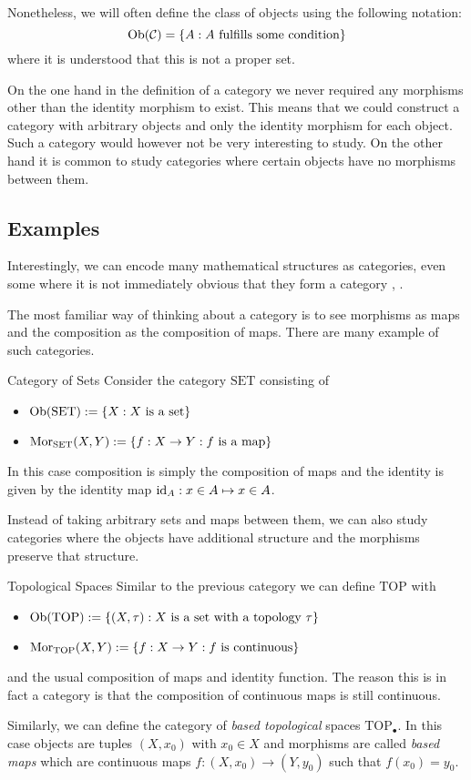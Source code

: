 Nonetheless, we will often define the class of objects using the following notation:
$$
\mathrm {Ob}(\mathcal{C}) = \{A: \text{$A$ fulfills some condition}\}
$$
where it is understood that this is not a proper set.


On the one hand in the definition of a category we never required any morphisms other than the identity morphism to exist.
This means that we could construct a category with arbitrary objects and only the identity morphism for each object. 
Such a category would however not be very interesting to study.
On the other hand it is common to study categories where certain objects have no morphisms between them.

\subsection{Examples}

Interestingly, we can encode many mathematical structures as categories, even some where it is not immediately obvious that they form a category \cite[Chap.~1~Ex.~1-7]{Roman2017}, \cite[Sec.~1.1]{Leinster2014-dc}.

The most familiar way of thinking about a category is to see morphisms as maps and the composition as the composition of maps. There are many example of such categories.

\begin{example}{Category of Sets}{}
Consider the category $\mathrm{SET}$ consisting of
\begin{itemize}
    \item $\mathrm {Ob}(\mathrm{SET}) := \{X: \text{$X$ is a set}\}$
    \item $\mathrm {Mor}_{\mathrm{SET}}(X,Y) := \{f: X \to Y: \text{$f$ is a map}\}$
\end{itemize}
In this case composition is simply the composition of maps and the identity is given by the identity map $\mathrm{id}_A: x \in A \mapsto x \in A$.
\end{example}

Instead of taking arbitrary sets and maps between them, we can also study categories where the objects have additional structure and the morphisms preserve that structure.

\begin{example}{Topological Spaces}{}
Similar to the previous category we can define $\mathrm{TOP}$ with
\begin{itemize}
    \item $\mathrm {Ob}(\mathrm{TOP}) := \{(X,\tau) : \text{$X$ is a set with a topology $\tau$}\}$
    \item $\mathrm {Mor}_{\mathrm{TOP}}(X,Y) := \{f: X \to Y: \text{$f$ is continuous}\}$
\end{itemize}
and the usual composition of maps and identity function. The reason this is in fact a category is that the composition of continuous maps is still continuous.

Similarly, we can define the category of \emph{based topological} spaces $\mathrm{TOP}_\bullet$. In this case objects are tuples $(X,x_0)$ with $x_0 \in X$ and morphisms are called \emph{based maps} which are continuous maps $f: (X,x_0) \to (Y,y_0)$ such that $f(x_0) = y_0$.
\end{example}

